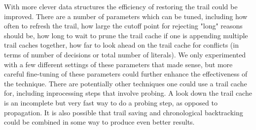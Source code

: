 \documentclass[runningheads]{llncs}
\begin{document}
With more clever data structures the efficiency of restoring the trail
could be improved. There are a number of parameters which can be
tuned, including how often to refresh the trail, how large the cutoff
point for rejecting "long" reasons should be, how long to wait to
prune the trail cache if one is appending multiple trail caches
together, how far to look ahead on the trail cache for conflicts (in
terms of number of decisions or total number of literals). We only
experimented with a few different settings of these parameters that
made sense, but more careful fine-tuning of these parameters could
further enhance the effectiveness of the technique. There are
potentially other techniques one could use a trail cache for,
including inprocessing steps that involve probing. A look down the
trail cache is an incomplete but very fast way to do a probing step,
as opposed to propagation. It is also possible that trail saving and
chronological backtracking could be combined in some way to produce
even better results.

{}

\end{document}
